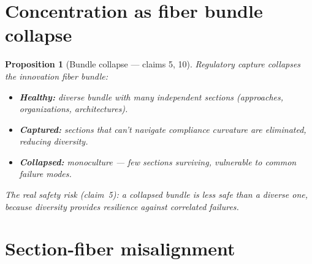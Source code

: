 \documentclass[11pt,a4paper]{article}
\newtheorem{proposition}[definition]{Proposition}
\begin{document}
\section{Concentration as fiber bundle collapse}

\begin{proposition}[Bundle collapse --- claims 5, 10]
\label{prop:collapse}
Regulatory capture collapses the innovation fiber bundle:
\begin{itemize}
  \item \textbf{Healthy:} diverse bundle with many independent sections
    (approaches, organizations, architectures).
  \item \textbf{Captured:} sections that can't navigate compliance
    curvature are eliminated, reducing diversity.
  \item \textbf{Collapsed:} monoculture --- few sections surviving,
    vulnerable to common failure modes.
\end{itemize}
The real safety risk (claim~5): a collapsed bundle is less safe than
a diverse one, because diversity provides resilience against correlated
failures.
\end{proposition}


\section{Section-fiber misalignment}
\label{sec:misalignment}
\end{document}

